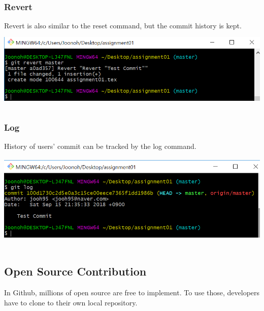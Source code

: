 \documentclass[18pt]{article}%
\begin{document}
\subsubsection {Revert}
Revert is also similar to the reset command, but the commit history is kept.\\
\includegraphics[height=4cm]{revert.PNG}

\subsubsection {Log}
History of users' commit can be tracked by the log command.\\
\includegraphics[height=5cm]{log.PNG}

 
 \subsection {Open Source Contribution}
In Github, millions of open source are free to implement. To use those, developers have to clone to their own local repository.
\end{document}
